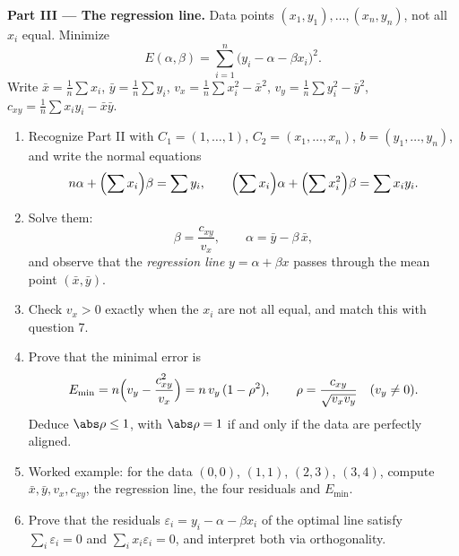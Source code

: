 \begin{problem}
\medskip
\noindent\textbf{Part III --- The regression line.} Data points
$(x_1, y_1), \dots, (x_n, y_n)$, not all $x_i$ equal. Minimize
\[
E(\alpha, \beta) = \sum_{i=1}^{n}\bigl(y_i - \alpha - \beta
x_i\bigr)^2 .
\]
Write $\bar x = \frac1n\sum x_i$, $\bar y = \frac1n\sum y_i$,
$v_x = \frac1n\sum x_i^2 - \bar x^2$, $v_y = \frac1n\sum y_i^2 -
\bar y^2$, $c_{xy} = \frac1n\sum x_i y_i - \bar x\bar y$.
\begin{enumerate}[resume]
  \item Recognize Part II with $C_1 = (1, \dots, 1)$, $C_2 =
        (x_1, \dots, x_n)$, $b = (y_1, \dots, y_n)$, and write
        the normal equations
        \[
        n\alpha + \Bigl(\sum x_i\Bigr)\beta = \sum y_i,
        \qquad
        \Bigl(\sum x_i\Bigr)\alpha + \Bigl(\sum
        x_i^2\Bigr)\beta = \sum x_i y_i .
        \]
  \item Solve them:
        \[
        \beta = \frac{c_{xy}}{v_x},
        \qquad
        \alpha = \bar y - \beta\,\bar x ,
        \]
        and observe that the \emph{regression line} $y = \alpha
        + \beta x$ passes through the mean point $(\bar x, \bar
        y)$.
  \item Check $v_x > 0$ exactly when the $x_i$ are not all
        equal, and match this with question 7.
  \item Prove that the minimal error is
        \[
        E_{\min} = n\Bigl(v_y - \frac{c_{xy}^2}{v_x}\Bigr)
        = n\,v_y\,(1 - \rho^2),
        \qquad
        \rho = \frac{c_{xy}}{\sqrt{v_x v_y}}
        \quad (v_y \neq 0).
        \]
        Deduce $\abs\rho \leq 1$, with $\abs\rho = 1$ if and
        only if the data are perfectly aligned.
  \item Worked example: for the data $(0,0)$, $(1,1)$, $(2,3)$,
        $(3,4)$, compute $\bar x, \bar y, v_x, c_{xy}$, the
        regression line, the four residuals and $E_{\min}$.
  \item Prove that the residuals $\varepsilon_i = y_i - \alpha -
        \beta x_i$ of the optimal line satisfy $\sum_i
        \varepsilon_i = 0$ and $\sum_i x_i\varepsilon_i = 0$,
        and interpret both via orthogonality.
\end{enumerate}


\end{problem}
